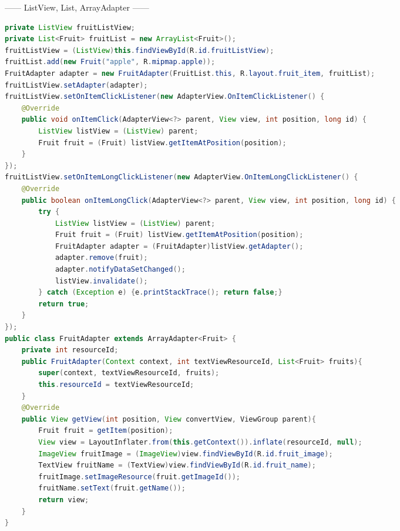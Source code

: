 \documentclass[10pt,a4paper,twocolumn]{report}
\begin{document}
\begin{CJK}{UTF8}{Courier New}
------ ListView, List, ArrayAdapter ------
\begin{lstlisting}[language=Java]
private ListView fruitListView;
private List<Fruit> fruitList = new ArrayList<Fruit>();
fruitListView = (ListView)this.findViewById(R.id.fruitListView);
fruitList.add(new Fruit("apple", R.mipmap.apple));
FruitAdapter adapter = new FruitAdapter(FruitList.this, R.layout.fruit_item, fruitList);
fruitListView.setAdapter(adapter);
fruitListView.setOnItemClickListener(new AdapterView.OnItemClickListener() {
	@Override
	public void onItemClick(AdapterView<?> parent, View view, int position, long id) {
		ListView listView = (ListView) parent;
		Fruit fruit = (Fruit) listView.getItemAtPosition(position);
	}
});
fruitListView.setOnItemLongClickListener(new AdapterView.OnItemLongClickListener() {
	@Override
	public boolean onItemLongClick(AdapterView<?> parent, View view, int position, long id) {
		try {
			ListView listView = (ListView) parent;
			Fruit fruit = (Fruit) listView.getItemAtPosition(position);
			FruitAdapter adapter = (FruitAdapter)listView.getAdapter();
			adapter.remove(fruit);
			adapter.notifyDataSetChanged();
			listView.invalidate();
		} catch (Exception e) {e.printStackTrace(); return false;}
		return true;
	}
});
public class FruitAdapter extends ArrayAdapter<Fruit> {
	private int resourceId;
	public FruitAdapter(Context context, int textViewResourceId, List<Fruit> fruits){
		super(context, textViewResourceId, fruits);
		this.resourceId = textViewResourceId;
	}
	@Override
	public View getView(int position, View convertView, ViewGroup parent){
		Fruit fruit = getItem(position);
		View view = LayoutInflater.from(this.getContext()).inflate(resourceId, null);
		ImageView fruitImage = (ImageView)view.findViewById(R.id.fruit_image);
		TextView fruitName = (TextView)view.findViewById(R.id.fruit_name);
		fruitImage.setImageResource(fruit.getImageId());
		fruitName.setText(fruit.getName());
		return view;
	}
}
\end{lstlisting}


\end{CJK}
\end{document}
